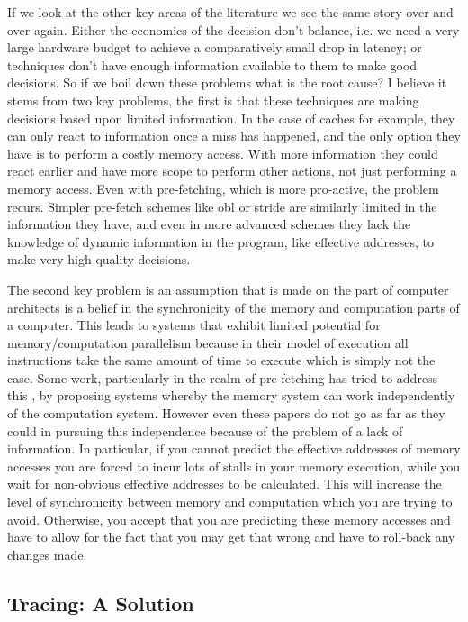 If we look at the other key areas of the literature we see the same story over and over again. Either the economics of the decision don't balance, i.e. we need a very large hardware budget to achieve a comparatively small drop in latency; or techniques don't have enough information available to them to make good decisions. So if we boil down these problems what is the root cause? I believe it stems from two key problems, the first is that these techniques are making decisions based upon limited information. In the case of caches for example, they can only react to information once a miss has happened, and the only option they have is to perform a costly memory access. With more information they could react earlier and have more scope to perform other actions, not just performing a memory access. Even with pre-fetching, which is more pro-active, the problem recurs. Simpler pre-fetch schemes like \gls{obl} or stride are similarly limited in the information they have, and even in more advanced schemes they lack the knowledge of dynamic information in the program, like effective addresses, to make very high quality decisions.

The second key problem is an assumption that is made on the part of computer architects is a belief in the synchronicity of the memory and computation parts of a computer. This leads to systems that exhibit limited potential for memory/computation parallelism because in their model of execution all instructions take the same amount of time to execute which is simply not the case. Some work, particularly in the realm of pre-fetching has tried to address this \cite{veidenbaumDecoupledAccessDRAM1997, vanderwielCompilerassistedDataPrefetch1999, mutluRunaheadExecutionAlternative2003}, by proposing systems whereby the memory system can work independently of the computation system. However even these papers do not go as far as they could in pursuing this independence because of the problem of a lack of information. In particular, if you cannot predict the effective addresses of memory accesses you are forced to incur lots of stalls in your memory execution, while you wait for non-obvious effective addresses to be calculated. This will increase the level of synchronicity between memory and computation which you are trying to avoid. Otherwise, you accept that you are predicting these memory accesses and have to allow for the fact that you may get that wrong and have to roll-back any changes made. 

\subsection{Tracing: A Solution}

